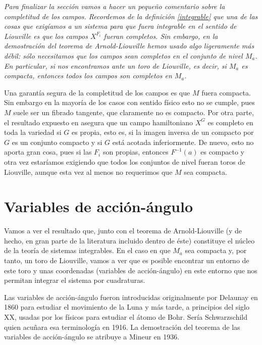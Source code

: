  \begin{obs}
   \em
   Para finalizar la sección vamos a hacer un pequeño comentario sobre la completitud de los campos. Recordemos de la definición \ref{integrable} que una de las cosas que exigíamos a un sistema para que fuera integrable en el sentido de Liouville es que los campos $X^{F_i}$ fueran completos. Sin embargo, en la demostración del teorema de Arnold-Liouville hemos usado algo ligeramente más débil: sólo necesitamos que los campos sean completos en el conjunto de nivel $M_a$. En particular, si nos encontramos ante un toro de Liouville, es decir, si $M_a$ es compacta, entonces todos los campos son completos en $M_a$.
   
   Una garantía segura de la completitud de los campos es que $M$ fuera compacta. Sin embargo en la mayoría de los casos con sentido físico esto no se cumple, pues $M$ suele ser un fibrado tangente, que claramente no es compacto. Por otra parte, el resultado expuesto en \cite{puta} asegura que un campo hamiltoniano $X^G$ es completo en toda la variedad si $G$ es propia, esto es, si la imagen inversa de un compacto por $G$ es un conjunto compacto y si $G$ está acotada inferiormente. De nuevo, esto no aporta gran cosa, pues si las $F_i$ son propias, entonces $F^{-1}(a)$ es compacto y otra vez estaríamos exigiendo que todos los conjuntos de nivel fueran toros de Liouville, aunque esta vez al menos no requerimos que $M$ sea compacta.
 \end{obs}

 \section{Variables de acción-ángulo}
 Vamos a ver el resultado que, junto con el teorema de Arnold-Liouville (y de hecho, en gran parte de la literatura incluido dentro de éste) constituye el núcleo de la teoría de sistemas integrables. En el caso en que $M_a$ sea compacta y, por tanto, un toro de Liouville, vamos a ver que es posible encontrar un entorno de este toro y unas coordenadas (variables de acción-ángulo) en este entorno que nos permitan integrar el sistema por cuadraturas.
 
 Las variables de acción-ángulo fueron introducidas originalmente por Delaunay en 1860 para estudiar el movimiento de la Luna y más tarde, a principios del siglo XX, usadas por los físicos para estudiar el átomo de Bohr. Sería Schwarzschild quien acuñara esa terminología en 1916. La demostración del teorema de las variables de acción-ángulo se atribuye a Mineur en 1936. 

